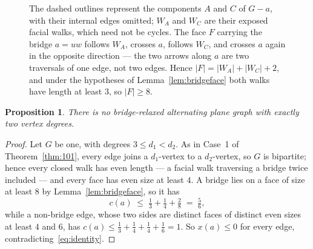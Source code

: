 \documentclass{baustms}
\theoremstyle{cupthm}
\newtheorem{proposition}[theorem]{Proposition}
\theoremstyle{cupdefn}
\theoremstyle{cuprem}
\begin{document}
\begin{figure}[ht]
\centering
{}
\caption{The dashed outlines represent the components $A$ and $C$ of $G-a$, with
their internal edges omitted; $W_A$ and $W_C$ are their exposed facial walks,
which need not be cycles. The face $F$ carrying the bridge $a=uw$ follows $W_A$,
crosses $a$, follows $W_C$, and crosses $a$ again in the opposite direction ---
the two arrows along $a$ are two traversals of one edge, not two edges. Hence
$|F| = |W_A| + |W_C| + 2$, and under the hypotheses of
Lemma~\ref{lem:bridgeface} both walks have length at least $3$, so
$|F| \ge 8$.}\label{fig:bridge}
\end{figure}

\begin{proposition}\label{prop:twoY-weak}
There is no bridge-relaxed alternating plane graph with exactly two vertex
degrees.
\end{proposition}

\begin{proof}
Let $G$ be one, with degrees $3 \le d_1 < d_2$. As in Case~1 of
Theorem~\ref{thm:101}, every edge joins a $d_1$-vertex to a $d_2$-vertex, so $G$
is bipartite; hence every closed walk has even length --- a facial walk
traversing a bridge twice included --- and every face has even size at least $4$.
A bridge lies on a face of size at least $8$ by Lemma~\ref{lem:bridgeface}, so it
has
\[
  c(a) \;\le\; \tfrac13 + \tfrac14 + \tfrac28 \;=\; \tfrac56 ,
\]
while a non-bridge edge, whose two sides are distinct faces of distinct even
sizes at least $4$ and $6$, has
$c(a) \le \tfrac13+\tfrac14+\tfrac14+\tfrac16 = 1$. So $x(a) \le 0$ for every
edge, contradicting~\eqref{eq:identity}.
\end{proof}
\end{document}
